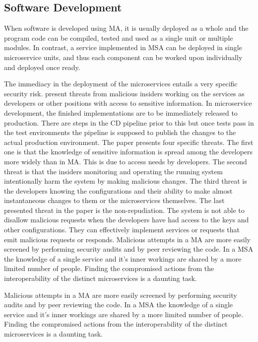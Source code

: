 \subsection{Software Development}
\begin{sloppypar}
    When software is developed using MA, it is usually deployed as a whole and
    the program code can be compiled, tested and used as a single unit or
    multiple modules. In contrast, a service implemented in MSA can be deployed
    in single microservice units, and thus each component can be worked upon
    individually and deployed once ready. 
\end{sloppypar}
\begin{sloppypar}
    The immediacy in the deployment of the microservices entails a very specific
    security risk. \citet{integinside} present threats from malicious insiders
    working on the services as developers or other positions with access to
    sensitive information. In microservice development, the finished
    implementations are to be immediately released to production. There are
    steps in the CD pipeline prior to this but once tests pass in the test
    environments the pipeline is supposed to publish the changes to the actual
    production environment. The paper presents four specific threats. The first
    one is that the knowledge of sensitive information is spread among the
    developers more widely than in MA. This is due to access needs by
    developers. The second threat is that the insiders monitoring and operating
    the running system intentionally harm the system by making malicious
    changes. The third threat is the developers knowing the configurations and
    their ability to make almost instantaneous changes to them or the
    microservices themselves. The last presented threat in the paper is the
    non-repudiation. The system is not able to disallow malicious requests when
    the developers have had access to the keys and other configurations. They
    can effectively implement services or requests that emit malicious requests
    or responds. Malicious attempts in a MA are more easily screened by
    performing security audits and by peer reviewing the code. In a MSA the
    knowledge of a single service and it’s inner workings are shared by a more
    limited number of people. Finding the compromised actions from the
    interoperability of the distinct microservices is a daunting task.
\end{sloppypar}
\begin{sloppypar}
    Malicious attempts in a MA are more easily screened by performing security
    audits and by peer reviewing the code. In a MSA the knowledge of a single
    service and it's inner workings are shared by a more limited number of
    people. Finding the compromised actions from the interoperability of the
    distinct microservices is a daunting task.
\end{sloppypar}

